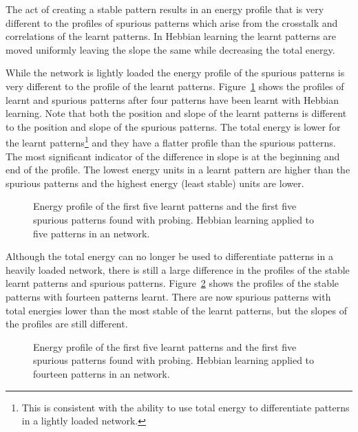 The act of creating a stable pattern results in an energy profile that is very different to the profiles of spurious patterns which arise from the crosstalk and correlations of the learnt patterns.  In Hebbian learning the learnt patterns are moved uniformly leaving the slope the same while decreasing the total energy.  

While the network is lightly loaded the energy profile of the spurious patterns is very different to the profile of the learnt patterns.  Figure~\ref{fig:EnergyProfileNoWeightDecay5} shows the profiles of learnt and spurious patterns after four patterns have been learnt with Hebbian learning.  Note that both the position and slope of the learnt patterns is different to the position and slope of the spurious patterns.  The total energy is lower for the learnt patterns\footnote{This is consistent with the ability to use total energy to differentiate patterns in a lightly loaded network.} and they have a flatter profile than the spurious patterns.  The most significant indicator of the difference in slope is at the beginning and end of the profile.  The lowest energy units in a learnt pattern are higher than the spurious patterns and the highest energy (least stable) units are lower. 

\begin{figure}[tbp]
\center
\small
	
	\caption{Energy profile of the first five learnt patterns and the first five spurious patterns found with probing. Hebbian learning applied to five patterns in an  network.}
	\label{fig:EnergyProfileNoWeightDecay5}
\end{figure}

Although the total energy can no longer be used to differentiate patterns in a heavily loaded network, there is still a large difference in the profiles of the stable learnt patterns and spurious patterns.  Figure~\ref{fig:EnergyProfileNoWeightDecay14} shows the profiles of the stable patterns with fourteen patterns learnt.  There are now spurious patterns with total energies lower than the most stable of the learnt patterns, but the slopes of the profiles are still different.

\begin{figure}[tbp]
\center
\small
	
	\caption{Energy profile of the first five learnt patterns and the first five spurious patterns found with probing. Hebbian learning applied to fourteen patterns in an  network.}
	\label{fig:EnergyProfileNoWeightDecay14}
\end{figure}



